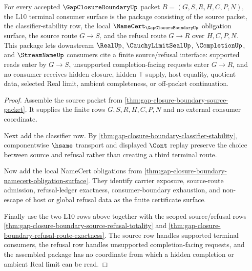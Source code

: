 \begin{theorem}
\label{thm:gap-closure-boundary-terminal-consumer-package}
For every accepted $\GapClosureBoundaryUp$ packet $B=(G,S,R,H,C,P,N)$, the L10 terminal consumer surface is the package consisting of the source packet, the classifier-stability row, the local $\NameCert_{\GapClosureBoundaryUp}$ obligation surface, the source route $G \longrightarrow S$, and the refusal route $G \longrightarrow R$ over $H,C,P,N$. This package lets downstream $\RealUp$, $\CauchyLimitSealUp$, $\CompletionUp$, and $\StreamNameUp$ consumers cite a finite source/refusal interface: supported reads enter by $G \longrightarrow S$, unsupported completion-facing requests enter $G \longrightarrow R$, and no consumer receives hidden closure, hidden $\mathsf{T}$ supply, host equality, quotient data, selected Real limit, ambient completeness, or off-packet continuation.
\end{theorem}
\begin{proof}
Assemble the source packet from \autoref{thm:gap-closure-boundary-source-packet}. It supplies the finite rows $G,S,R,H,C,P,N$ and no external consumer coordinate.

Next add the classifier row. By \autoref{thm:gap-closure-boundary-classifier-stability}, componentwise $\hsame$ transport and displayed $\Cont$ replay preserve the choice between source and refusal rather than creating a third terminal route.

Now add the local NameCert obligations from \autoref{thm:gap-closure-boundary-namecert-obligation-surface}. They identify carrier exposure, source-route admission, refusal-ledger exactness, consumer-boundary exhaustion, and non-escape of host or global refusal data as the finite certificate surface.

Finally use the two L10 rows above together with the scoped source/refusal rows \autoref{thm:gap-closure-boundary-source-refusal-totality} and \autoref{thm:gap-closure-boundary-refusal-route-exactness}. The source row handles supported terminal consumers, the refusal row handles unsupported completion-facing requests, and the assembled package has no coordinate from which a hidden completion or ambient Real limit can be read.
\end{proof}
